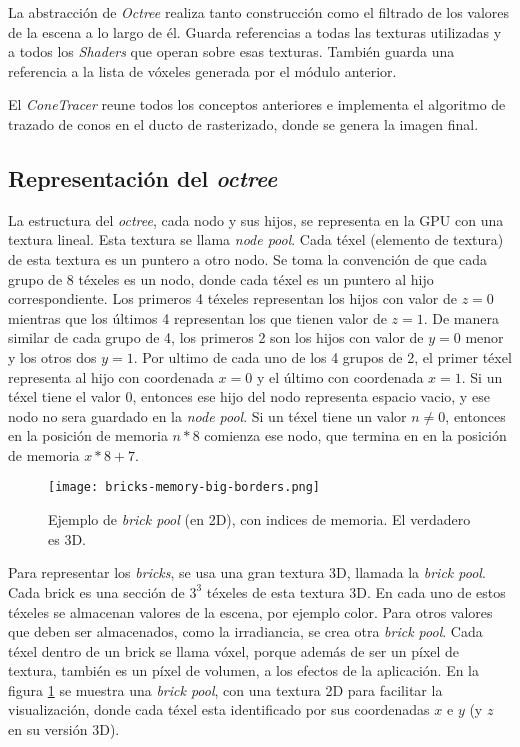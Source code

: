 La abstracción de \textit{Octree} realiza tanto construcción como el filtrado de los valores de la escena a lo largo de él.
Guarda referencias a todas las texturas utilizadas y a todos los \textit{Shaders} que operan sobre esas texturas.
También guarda una referencia a la lista de vóxeles generada por el módulo anterior.

El \textit{ConeTracer} reune todos los conceptos anteriores e implementa el algoritmo de trazado de conos en el ducto de rasterizado, donde se genera la imagen final.

\subsection{Representación del \textit{octree}}

La estructura del \textit{octree}, cada nodo y sus hijos, se representa en la GPU con una textura lineal.
Esta textura se llama \textit{node pool}.
Cada téxel (elemento de textura) de esta textura es un puntero a otro nodo.
Se toma la convención de que cada grupo de 8 téxeles es un nodo, donde cada téxel es un puntero al hijo correspondiente.
Los primeros 4 téxeles representan los hijos con valor de $z = 0$ mientras que los últimos 4 representan los que tienen valor de $z = 1$.
De manera similar de cada grupo de 4, los primeros 2 son los hijos con valor de $y = 0$ menor y los otros dos $y = 1$.
Por ultimo de cada uno de los 4 grupos de 2, el primer téxel representa al hijo con coordenada $x = 0$ y el último con coordenada $x = 1$.
Si un téxel tiene el valor $0$, entonces ese hijo del nodo representa espacio vacio, y ese nodo no sera guardado en la \textit{node pool}.
Si un téxel tiene un valor $n \not = 0$, entonces en la posición de memoria $n * 8$ comienza ese nodo, que termina en en la posición de memoria $x * 8 + 7$.

\begin{figure}[h!]
    \centering
    \texttt{[image: bricks-memory-big-borders.png]}
    \caption{Ejemplo de \textit{brick pool} (en 2D), con indices de memoria. El verdadero es 3D.}
    \label{fig:brick_pool_example}
\end{figure}

Para representar los \textit{bricks}, se usa una gran textura 3D, llamada la \textit{brick pool}.
Cada brick es una sección de $3^3$ téxeles de esta textura 3D.
En cada uno de estos téxeles se almacenan valores de la escena, por ejemplo color.
Para otros valores que deben ser almacenados, como la irradiancia, se crea otra \textit{brick pool}.
Cada téxel dentro de un brick se llama vóxel, porque además de ser un píxel de textura, también es un píxel de volumen, a los efectos de la aplicación.
En la figura \ref{fig:brick_pool_example} se muestra una \textit{brick pool}, con una textura 2D para facilitar la visualización, donde cada téxel esta identificado por sus coordenadas $x$ e $y$ (y $z$ en su versión 3D).

